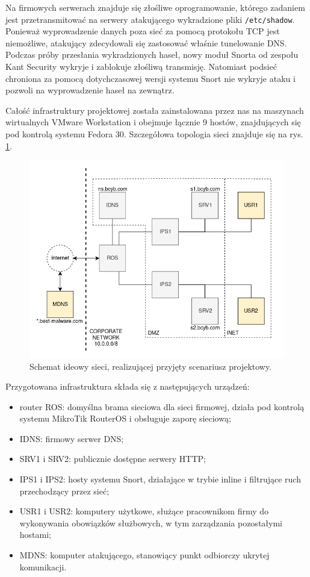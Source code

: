 \documentclass{eiti-raport}
\begin{document}
Na firmowych serwerach znajduje się złośliwe oprogramowanie, którego zadaniem jest przetransmitować na serwery atakującego wykradzione pliki \texttt{/etc/shadow}. Ponieważ wyprowadzenie danych poza sieć za pomocą protokołu TCP jest niemożliwe, atakujący zdecydowali się zastosować właśnie tunelowanie DNS. Podczas próby przesłania wykradzionych haseł, nowy moduł Snorta od zespołu Kant Security wykryje i zablokuje złośliwą transmisję. Natomiast podsieć chroniona za pomocą dotychczasowej wersji systemu Snort nie wykryje ataku i pozwoli na wyprowadzenie haseł na zewnątrz. 

Całość infrastruktury projektowej została zainstalowana przez nas na maszynach wirtualnych VMware Workstation i obejmuje łącznie 9 hostów, znajdujących się pod kontrolą systemu Fedora 30. Szczegółowa topologia sieci znajduje się na rys. \ref{fig:topologia}. 
\begin{figure}[!h] \centering
	\includegraphics[width=0.9\linewidth]{img/BCYB_topologia.png}
	\caption{Schemat ideowy sieci, realizującej przyjęty scenariusz projektowy.} \label{fig:topologia}
\end{figure}
Przygotowana infrastruktura składa się z następujących urządzeń: 
\begin{itemize}
	\item router ROS: domyślna brama sieciowa dla sieci firmowej, działa pod kontrolą systemu MikroTik RouterOS i obsługuje zaporę sieciową;
	\item IDNS: firmowy serwer DNS;
	\item SRV1 i SRV2: publicznie dostępne serwery HTTP;
	\item IPS1 i IPS2: hosty systemu Snort, działające w trybie inline i filtrujące ruch przechodzący przez sieć;
	\item USR1 i USR2: komputery użytkowe, służące pracownikom firmy do wykonywania obowiązków służbowych, w tym zarządzania pozostałymi hostami;
	\item MDNS: komputer atakującego, stanowiący punkt odbiorczy ukrytej komunikacji. 
\end{itemize}
\end{document}
